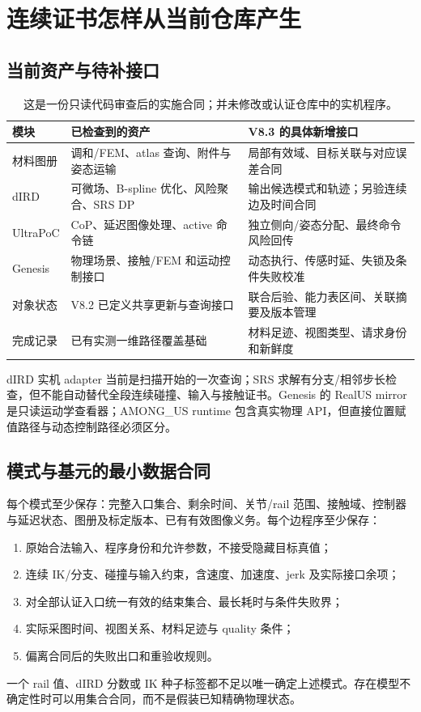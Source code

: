 \documentclass[UTF8,11pt,a4paper,fontset=fandol]{ctexart}
\numberwithin{equation}{section}
\theoremstyle{definition}
\begin{document}
\section{连续证书怎样从当前仓库产生}
\label{sec:code}

\subsection{当前资产与待补接口}
\begin{table}[htbp]\centering\small
\begin{tabularx}{\linewidth}{P{24mm}YY}
\toprule
模块 & 已检查到的资产 & V8.3 的具体新增接口\\\midrule
材料图册 & 调和/FEM、atlas 查询、附件与姿态运输 & 局部有效域、目标关联与对应误差合同\\
dIRD & 可微场、B-spline 优化、风险聚合、SRS DP & 输出候选模式和轨迹；另验连续边及时间合同\\
UltraPoC & CoP、延迟图像处理、active 命令链 & 独立侧向/姿态分配、最终命令风险回传\\
Genesis & 物理场景、接触/FEM 和运动控制接口 & 动态执行、传感时延、失锁及条件失败校准\\
对象状态 & V8.2 已定义共享更新与查询接口 & 联合后验、能力表区间、关联摘要及版本管理\\
完成记录 & 已有实测一维路径覆盖基础 & 材料足迹、视图类型、请求身份和新鲜度\\
\bottomrule
\end{tabularx}
\caption{这是一份只读代码审查后的实施合同；并未修改或认证仓库中的实机程序。}
\end{table}

dIRD 实机 adapter 当前是扫描开始的一次查询；SRS 求解有分支/相邻步长检查，但不能自动替代全段连续碰撞、输入与接触证书\cite{codedird,codesrs}。Genesis 的 RealUS mirror 是只读运动学查看器；AMONG\_US runtime 包含真实物理 API，但直接位置赋值路径与动态控制路径必须区分\cite{codetwin,codegenesis}。

\subsection{模式与基元的最小数据合同}
每个模式至少保存：完整入口集合、剩余时间、关节/rail 范围、接触域、控制器与延迟状态、图册及标定版本、已有有效图像义务。每个边程序至少保存：
\begin{enumerate}
\item 原始合法输入、程序身份和允许参数，不接受隐藏目标真值；
\item 连续 IK/分支、碰撞与输入约束，含速度、加速度、jerk 及实际接口余项；
\item 对全部认证入口统一有效的结束集合、最长耗时与条件失败界；
\item 实际采图时间、视图关系、材料足迹与 quality 条件；
\item 偏离合同后的失败出口和重验收规则。
\end{enumerate}
一个 rail 值、dIRD 分数或 IK 种子标签都不足以唯一确定上述模式。存在模型不确定性时可以用集合合同，而不是假装已知精确物理状态。
\end{document}
